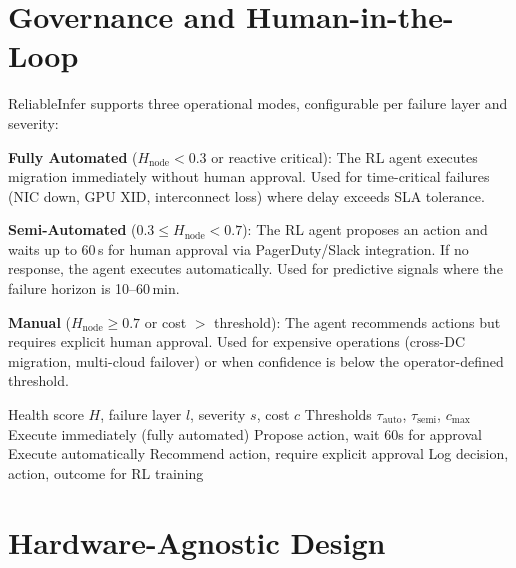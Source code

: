 \documentclass[conference,10pt,letterpaper]{IEEEtran}
\begin{document}
\section{Governance and Human-in-the-Loop}
\label{sec:governance}

ReliableInfer supports three operational modes, configurable per failure layer and severity:

\textbf{Fully Automated} ($H_{\text{node}} < 0.3$ or reactive critical): The RL agent executes migration immediately without human approval. Used for time-critical failures (NIC down, GPU XID, interconnect loss) where delay exceeds SLA tolerance.

\textbf{Semi-Automated} ($0.3 \leq H_{\text{node}} < 0.7$): The RL agent proposes an action and waits up to 60\,s for human approval via PagerDuty/Slack integration. If no response, the agent executes automatically. Used for predictive signals where the failure horizon is 10--60\,min.

\textbf{Manual} ($H_{\text{node}} \geq 0.7$ or cost $>$ threshold): The agent recommends actions but requires explicit human approval. Used for expensive operations (cross-DC migration, multi-cloud failover) or when confidence is below the operator-defined threshold.

\begin{algorithm}[!t]
\caption{Governance Decision Framework}
\label{alg:governance}
\begin{algorithmic}[1]
\REQUIRE Health score $H$, failure layer $l$, severity $s$, cost $c$
\REQUIRE Thresholds $\tau_{\text{auto}}$, $\tau_{\text{semi}}$, $c_{\max}$
    \STATE Execute immediately (fully automated)
    \STATE Propose action, wait 60s for approval
     \STATE Execute automatically \ENDIF
\ELSE
    \STATE Recommend action, require explicit approval
\ENDIF
\STATE Log decision, action, outcome for RL training
\end{algorithmic}
\end{algorithm}

\section{Hardware-Agnostic Design}
\label{sec:agnostic}
\end{document}

